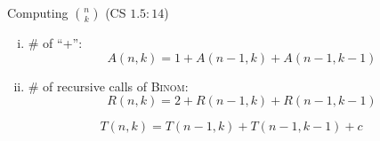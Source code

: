 
\begin{frame}{}
  \begin{exampleblock}{Computing $\binom{n}{k}$ (CS $1.5:14$)}
    
  \end{exampleblock}

  \pause
\end{frame}

\begin{frame}{}
  

  \begin{enumerate}[(i)]
    \pause
    \item \# of ``+'':
      \pause
      \[
	A(n,k) = 1 + A(n-1, k) + A(n-1, k-1)
      \]
    \pause
    \vspace{-0.60cm}
    \item \# of recursive calls of \textsc{Binom}:
      \pause
      \[
	R(n,k) = 2 + R(n-1, k) + R(n-1, k-1)
      \]
  \end{enumerate}

  \pause
  \[
    \boxed{T(n,k) = T(n-1, k) + T(n-1, k-1) + c}
  \]
\end{frame}

\begin{frame}{}
\end{frame}

\begin{frame}{}
  
\end{frame}
